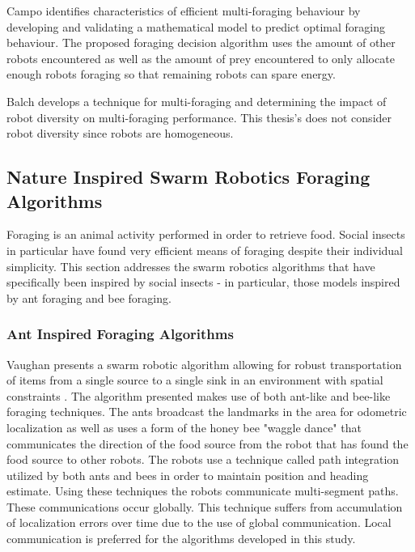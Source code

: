 \begin{itemize}
Campo \cite{campo2007efficient} identifies characteristics of efficient multi-foraging behaviour by developing and validating a mathematical model to predict optimal foraging behaviour. The proposed foraging decision algorithm uses the amount of other robots encountered as well as the amount of prey encountered to only allocate enough robots foraging  so that remaining robots can spare energy.

Balch \cite{balch1999impact} develops a technique for multi-foraging and determining the impact of robot diversity on multi-foraging performance. This thesis's does not consider robot diversity since robots are homogeneous.

\end{itemize}




\subsection{Nature Inspired Swarm Robotics Foraging Algorithms}

Foraging is an animal activity performed in order to retrieve food. Social insects in particular have found very efficient means of foraging despite their individual simplicity. This section addresses the swarm robotics algorithms that have specifically been inspired by social insects - in particular, those models inspired by ant foraging and bee foraging. 


\subsubsection{Ant Inspired Foraging Algorithms}
\label{sec:second:natureinspired:ant}

Vaughan presents a swarm robotic algorithm allowing for robust transportation of items from a single source to a single sink in an environment with spatial constraints \cite{vaughan2000blazing}. The algorithm presented makes use of both ant-like and bee-like foraging techniques. The ants broadcast the landmarks in the area for odometric localization as well as uses a form of the  honey bee "waggle dance" that communicates the direction of the food source from the robot that has found the food source to other robots. The robots use a technique called path integration utilized by both ants and bees in order to maintain position and heading estimate. Using these techniques the robots communicate multi-segment paths. These communications occur globally. This technique suffers from accumulation of localization errors over time due to the use of global communication. Local communication is preferred for the algorithms developed in this study.

